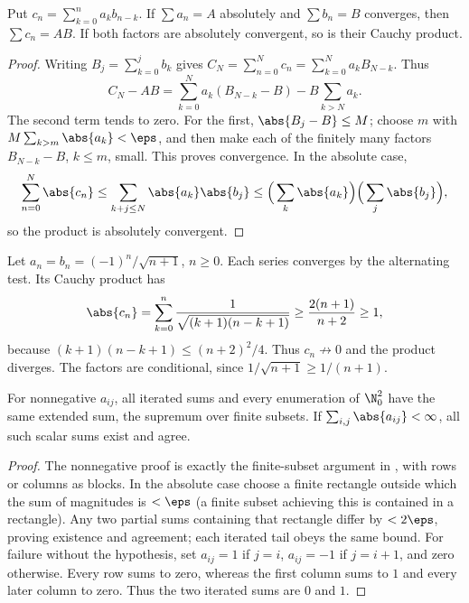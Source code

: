 \begin{theorem}
Put $c_n=\sum_{k=0}^n a_kb_{n-k}$. If $\sum a_n=A$ absolutely and $\sum b_n=B$ converges, then $\sum c_n=AB$. If both factors are absolutely convergent, so is their Cauchy product.
\end{theorem}
\begin{proof}
Writing $B_j=\sum_{k=0}^j b_k$ gives $C_N=\sum_{n=0}^Nc_n=\sum_{k=0}^N a_kB_{N-k}$. Thus
\[C_N-AB=\sum_{k=0}^Na_k(B_{N-k}-B)-B\sum_{k>N}a_k.\]
The second term tends to zero. For the first, $\abs{B_j-B}\leq M$; choose $m$ with $M\sum_{k>m}\abs{a_k}<\eps$, and then make each of the finitely many factors $B_{N-k}-B$, $k\leq m$, small. This proves convergence. In the absolute case,
\[\sum_{n=0}^N\abs{c_n}\leq\sum_{k+j\leq N}\abs{a_k}\abs{b_j}\leq\Big(\sum_k\abs{a_k}\Big)\Big(\sum_j\abs{b_j}\Big),\]
so the product is absolutely convergent.
\end{proof}

\begin{example}
Let $a_n=b_n=(-1)^n/\sqrt{n+1}$, $n\geq0$. Each series converges by the alternating test. Its Cauchy product has
\[\abs{c_n}=\sum_{k=0}^n\frac1{\sqrt{(k+1)(n-k+1)}}\geq\frac{2(n+1)}{n+2}\geq1,\]
because $(k+1)(n-k+1)\leq(n+2)^2/4$. Thus $c_n\not\to0$ and the product diverges. The factors are conditional, since $1/\sqrt{n+1}\geq1/(n+1)$.
\end{example}

\begin{theorem}
For nonnegative $a_{ij}$, all iterated sums and every enumeration of $\N_0^2$ have the same extended sum, the supremum over finite subsets. If $\sum_{i,j}\abs{a_{ij}}<\infty$, all such scalar sums exist and agree.
\end{theorem}
\begin{proof}
The nonnegative proof is exactly the finite-subset argument in , with rows or columns as blocks. In the absolute case choose a finite rectangle outside which the sum of magnitudes is $<\eps$ (a finite subset achieving this is contained in a rectangle). Any two partial sums containing that rectangle differ by $<2\eps$, proving existence and agreement; each iterated tail obeys the same bound.
For failure without the hypothesis, set $a_{ij}=1$ if $j=i$, $a_{ij}=-1$ if $j=i+1$, and zero otherwise. Every row sums to zero, whereas the first column sums to $1$ and every later column to zero. Thus the two iterated sums are $0$ and $1$.
\end{proof}

